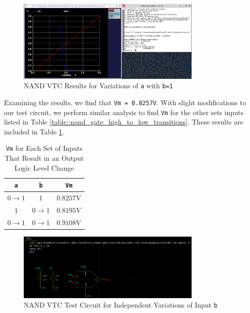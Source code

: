 \documentclass[fleqn]{article}
\begin{document}
	\begin{figure}[H]
		\centerline{\includegraphics[width=0.8\textwidth]{nand_vtc_sweep_va.png}}
		\caption{NAND VTC Results for Variations of \texttt{a} with \texttt{b=1}}
		\label{fig::nand_vtc_sweep_va}
	\end{figure}
	
	Examining the results, we find that \texttt{Vm = 0.8257V}. With slight modifications to our test circuit, we perform similar analysis to find \texttt{Vm} for the other sets inputs listed in Table \ref{table::nand_gate_high_to_low_transitions}. These results are included in Table \ref{table::nand_gate_vm}.
	
	\begin{table}[H]
	\begin{center}
	\caption{\texttt{Vm} for Each Set of Inputs That Result in an Output Logic Level Change}
	\label{table::nand_gate_vm}
	\begin{tabular}{| c | c | c |}
		\hline
		\texttt{a} & \texttt{b} & \texttt{Vm}\\
		\hline	
		$0 \rightarrow 1$ & $1$ & $0.8257 \text{V}$\\
		\hline	
		$1$ & $0 \rightarrow 1$ & $0.8195 \text{V}$\\
		\hline	
		$0 \rightarrow 1$ & $0 \rightarrow 1$ & $0.9108 \text{V}$\\
		\hline
	\end{tabular}
	\end{center}
	\end{table}
	
	\begin{figure}[H]
		\centerline{\includegraphics[width=0.8\textwidth]{nand_vtc_test_sweep_vb.png}}
		\caption{NAND VTC Test Circuit for Independent Variations of Input \texttt{b}}
		\label{fig::nand_vtc_test_sweep_vb}
	\end{figure}
	
\end{document}
